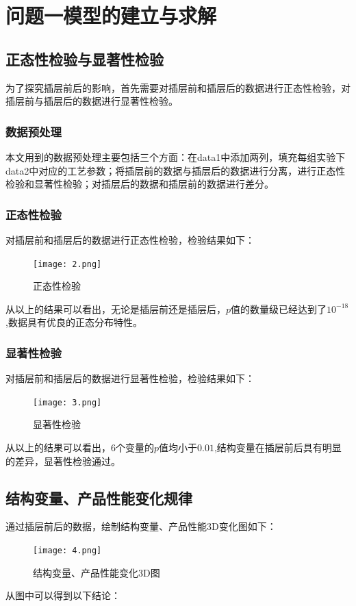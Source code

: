 \documentclass[withoutpreface,bwprint]{cumcmthesis} %
\begin{document}
\section{问题一模型的建立与求解}
\subsection{正态性检验与显著性检验}
为了探究插层前后的影响，首先需要对插层前和插层后的数据进行正态性检验，对插层前与插层后的数据进行显著性检验。
\subsubsection{数据预处理}
本文用到的数据预处理主要包括三个方面：在data1中添加两列，填充每组实验下data2中对应的工艺参数；将插层前的数据与插层后的数据进行分离，进行正态性检验和显著性检验；对插层后的数据和插层前的数据进行差分。
\subsubsection{正态性检验}
对插层前和插层后的数据进行正态性检验，检验结果如下：
   \begin{figure}[H]
	\centering
	\texttt{[image: 2.png]}
	\caption{正态性检验}
	\label{2}
\end{figure}
从以上的结果可以看出，无论是插层前还是插层后，$p$值的数量级已经达到了$10^{-18}$,数据具有优良的正态分布特性。

\subsubsection{显著性检验}
对插层前和插层后的数据进行显著性检验，检验结果如下：
\begin{figure}[H]
	\centering
	\texttt{[image: 3.png]}
	\caption{显著性检验}
	\label{3}
\end{figure}
从以上的结果可以看出，6个变量的$p$值均小于$0.01$,结构变量在插层前后具有明显的差异，显著性检验通过。

\subsection{结构变量、产品性能变化规律}
通过插层前后的数据，绘制结构变量、产品性能3D变化图如下：
   \begin{figure}[H]
	\centering
	\texttt{[image: 4.png]}
	\caption{结构变量、产品性能变化3D图}
	\label{5}
\end{figure}
从图中可以得到以下结论：
\end{document}
